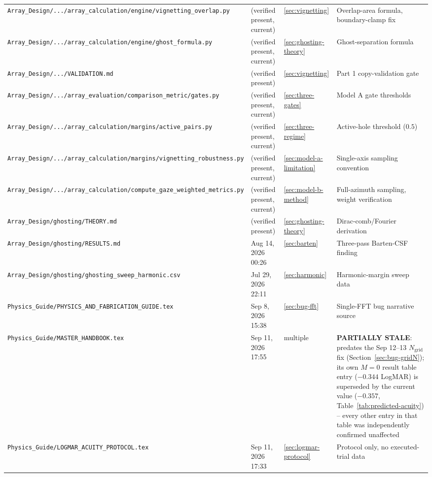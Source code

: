 \begin{longtable}{p{5.8cm}p{2.4cm}p{1.2cm}p{5.4cm}}
\texttt{Array\_Design/.../array\_calculation/engine/vignetting\_overlap.py} & (verified present, current) & \ref{sec:vignetting} & Overlap-area formula, boundary-clamp fix \\
\texttt{Array\_Design/.../array\_calculation/engine/ghost\_formula.py} & (verified present, current) & \ref{sec:ghosting-theory} & Ghost-separation formula \\
\texttt{Array\_Design/.../VALIDATION.md} & (verified present) & \ref{sec:vignetting} & Part 1 copy-validation gate \\
\texttt{Array\_Design/.../array\_evaluation/comparison\_metric/gates.py} & (verified present, current) & \ref{sec:three-gates} & Model A gate thresholds \\
\texttt{Array\_Design/.../array\_calculation/margins/active\_pairs.py} & (verified present, current) & \ref{sec:three-regime} & Active-hole threshold ($0.5$) \\
\texttt{Array\_Design/.../array\_calculation/margins/vignetting\_robustness.py} & (verified present, current) & \ref{sec:model-a-limitation} & Single-axis sampling convention \\
\texttt{Array\_Design/.../array\_calculation/compute\_gaze\_weighted\_metrics.py} & (verified present, current) & \ref{sec:model-b-method} & Full-azimuth sampling, weight verification \\
\texttt{Array\_Design/ghosting/THEORY.md} & (verified present) & \ref{sec:ghosting-theory} & Dirac-comb/Fourier derivation \\
\texttt{Array\_Design/ghosting/RESULTS.md} & Aug 14, 2026 00:26 & \ref{sec:barten} & Three-pass Barten-CSF finding \\
\texttt{Array\_Design/ghosting/ghosting\_sweep\_harmonic.csv} & Jul 29, 2026 22:11 & \ref{sec:harmonic} & Harmonic-margin sweep data \\
\texttt{Physics\_Guide/PHYSICS\_AND\_FABRICATION\_GUIDE.tex} & Sep 8, 2026 15:38 & \ref{sec:bug-fft} & Single-FFT bug narrative source \\
\texttt{Physics\_Guide/MASTER\_HANDBOOK.tex} & Sep 11, 2026 17:55 & multiple & \textbf{PARTIALLY STALE}: predates the Sep 12--13 $N_{\mathrm{grid}}$ fix (Section~\ref{sec:bug-gridN}); its own $M{=}0$ result table entry ($-0.344$ LogMAR) is superseded by the current value ($-0.357$, Table~\ref{tab:predicted-acuity}) -- every other entry in that table was independently confirmed unaffected \\
\texttt{Physics\_Guide/LOGMAR\_ACUITY\_PROTOCOL.tex} & Sep 11, 2026 17:33 & \ref{sec:logmar-protocol} & Protocol only, no executed-trial data \\

\end{longtable}
